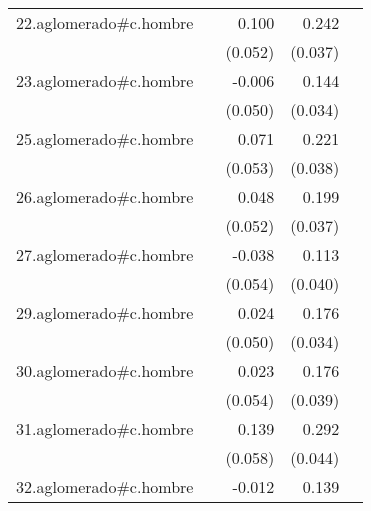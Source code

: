 {\begin{longtable}{l*{4}{D{.}{.}{-1}}}
\addlinespace
22.aglomerado#c.hombre&                     &       0.100         &       0.242\sym{***}&                     \\
            &                     &     (0.052)         &     (0.037)         &                     \\
\addlinespace
23.aglomerado#c.hombre&                     &      -0.006         &       0.144\sym{***}&                     \\
            &                     &     (0.050)         &     (0.034)         &                     \\
\addlinespace
25.aglomerado#c.hombre&                     &       0.071         &       0.221\sym{***}&                     \\
            &                     &     (0.053)         &     (0.038)         &                     \\
\addlinespace
26.aglomerado#c.hombre&                     &       0.048         &       0.199\sym{***}&                     \\
            &                     &     (0.052)         &     (0.037)         &                     \\
\addlinespace
27.aglomerado#c.hombre&                     &      -0.038         &       0.113\sym{**} &                     \\
            &                     &     (0.054)         &     (0.040)         &                     \\
\addlinespace
29.aglomerado#c.hombre&                     &       0.024         &       0.176\sym{***}&                     \\
            &                     &     (0.050)         &     (0.034)         &                     \\
\addlinespace
30.aglomerado#c.hombre&                     &       0.023         &       0.176\sym{***}&                     \\
            &                     &     (0.054)         &     (0.039)         &                     \\
\addlinespace
31.aglomerado#c.hombre&                     &       0.139\sym{*}  &       0.292\sym{***}&                     \\
            &                     &     (0.058)         &     (0.044)         &                     \\
\addlinespace
32.aglomerado#c.hombre&                     &      -0.012         &       0.139\sym{***}&                     \\

\end{longtable}}
